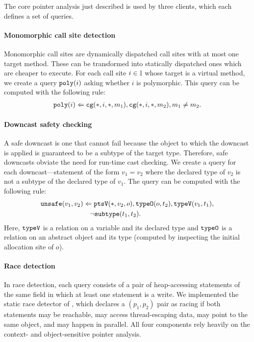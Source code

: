 
The core pointer analysis just described is used by three clients, which each
defines a set of queries.

\paragraph{Monomorphic call site detection}

Monomorphic call sites are dynamically dispatched call sites with at most one
target method.  These can be transformed into statically dispatched ones which
are cheaper to execute.
For each call site $i \in {\mathbb I}$ whose target is a virtual method,
we create a query $\text{\tt poly}(i)$ asking whether $i$ is polymorphic.
This query can be computed with the following rule:
\begin{align}
\text{\tt poly}(i) \Leftarrow \text{\tt cg}(*,i,*,m_1), \text{\tt cg}(*,i,*,m_2), m_1 \neq m_2.
\end{align}

\paragraph{Downcast safety checking}

A safe downcast is one that cannot fail because the object to which the
downcast is applied is guaranteed to be a subtype of the target type.
Therefore, safe downcasts obviate the need for run-time cast checking.
We create a query for each downcast---statement of the form $v_1 = v_2$ where the
declared type of $v_2$ is not a subtype of the declared type of $v_1$.
The query can be computed with the following rule:
\begin{align}
& \text{\tt unsafe}(v_1,v_2) \Leftarrow \text{\tt ptsV}(*,v_2,o), \text{\tt typeO}(o,t_2), \text{\tt typeV}(v_1,t_1), \nonumber \\
& \hspace{1in} \neg\text{\tt subtype}(t_1,t_2).
\end{align}
Here, $\text{\tt typeV}$ is a relation on a variable and its declared type
and $\text{\tt typeO}$ is a relation on an abstract object and its type
(computed by inspecting the initial allocation site of $o$).

\paragraph{Race detection}

In race detection, each query consists of a pair of heap-accessing statements
of the same field in which at least one statement is a write.  We implemented the
static race detector of \cite{NaikAikenWhaley2006}, which declares a
$(p_1,p_2)$ pair as racing if both statements may be reachable, may access
thread-escaping data, may point to the same object, and may happen in parallel.
All four components rely heavily on the context- and object-sensitive pointer
analysis.


